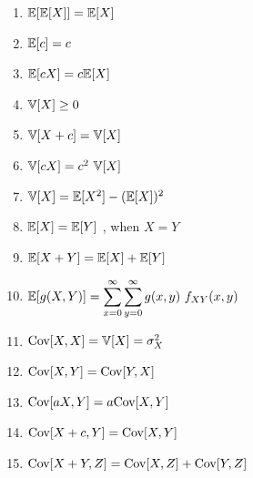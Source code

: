 \begin{multicols}{2}
\begin{enumerate}[resume*=calcrulesrv]
    \item $\mathbb{E}[\mathbb{E}[X]] = \mathbb{E}[X]$
    \hfill \cite{common/online/chatgpt}
    
    \item $\mathbb{E}[c] = c$
    \hfill \cite{statistics/book/Statistics-for-Data-Scientists/Maurits-Kaptein}

    \item $\mathbb{E}[cX] = c \mathbb{E}[X]$
    \hfill \cite{statistics/book/Statistics-for-Data-Scientists/Maurits-Kaptein}

    \item $\mathbb{V}[X] \geq 0$
    \hfill \cite{statistics/book/Statistics-for-Data-Scientists/Maurits-Kaptein}

    \item $\mathbb{V}[X + c] = \mathbb{V}[X]$
    \hfill \cite{statistics/book/Statistics-for-Data-Scientists/Maurits-Kaptein}

    \item $\mathbb{V}[cX] = c^2\ \mathbb{V}[X]$
    \hfill \cite{statistics/book/Statistics-for-Data-Scientists/Maurits-Kaptein}

    \item $\mathbb{V}[X] = \mathbb{E}[X^2] - (\mathbb{E}[X])^2$
    \hfill \cite{statistics/book/Statistics-for-Data-Scientists/Maurits-Kaptein}

    \item $\mathbb{E}[X] = \mathbb{E}[Y]$ , when $X = Y$
    \hfill \cite{statistics/book/Statistics-for-Data-Scientists/Maurits-Kaptein}

    \item $\mathbb{E}[X + Y] = \mathbb{E}[X] + \mathbb{E}[Y]$
    \hfill \cite{statistics/book/Statistics-for-Data-Scientists/Maurits-Kaptein}

    \item $\mathbb{E}[g(X, Y )] = \displaystyle\sum^\infty_{x=0} \displaystyle\sum^\infty_{y=0} g(x, y)\ f_{X Y} (x, y)$
    \hfill \cite{statistics/book/Statistics-for-Data-Scientists/Maurits-Kaptein}

    \item $\text{Cov}[X, X] = \mathbb{V}[X] = \sigma^2_X$
    \hfill \cite{statistics/book/Statistics-for-Data-Scientists/Maurits-Kaptein}

    \item $\text{Cov}[X, Y] = \text{Cov}[Y, X]$
    \hfill \cite{statistics/book/Statistics-for-Data-Scientists/Maurits-Kaptein}

    \item $\text{Cov}[aX, Y] = a\text{Cov}[X, Y]$
    \hfill \cite{statistics/book/Statistics-for-Data-Scientists/Maurits-Kaptein}

    \item $\text{Cov}[X + c, Y] = \text{Cov}[X, Y]$
    \hfill \cite{statistics/book/Statistics-for-Data-Scientists/Maurits-Kaptein}

    \item $\text{Cov}[X + Y, Z] = \text{Cov}[X, Z] + \text{Cov}[Y, Z]$
    \hfill \cite{statistics/book/Statistics-for-Data-Scientists/Maurits-Kaptein}
\end{enumerate}
\end{multicols}




